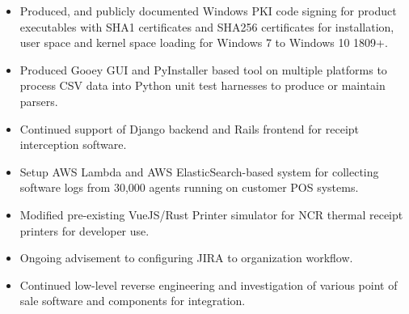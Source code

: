 \documentclass[10pt,letter,ragged2e]{altacv}
\begin{document}
\begin{paracol}{2}
\begin{itemize}
\item Produced, and publicly documented Windows PKI code signing for product executables with SHA1 certificates and SHA256 certificates for installation, user space and kernel space loading for Windows 7 to Windows 10 1809+.
\item Produced Gooey GUI and PyInstaller based tool on multiple platforms to process CSV data into Python unit test harnesses to produce or maintain parsers.
\item Continued support of Django backend and Rails frontend for receipt interception software.
\item Setup AWS Lambda and AWS ElasticSearch-based system for collecting software logs from 30,000 agents running on customer POS systems.
\item Modified pre-existing VueJS/Rust Printer simulator for NCR thermal receipt printers for developer use.
\item Ongoing advisement to configuring JIRA to organization workflow.
\item Continued low-level reverse engineering and investigation of various point of sale software and components for integration.
\end{itemize}

\divider



\end{paracol}
\end{document}
